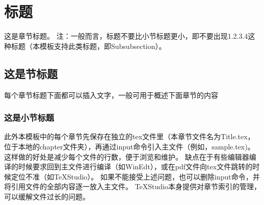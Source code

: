 \chapter{标题}

这是章节标题。
注：一般而言，标题不要比小节标题更小，即不要出现1.2.3.4这种标题（本模板支持此类标题，即Subsubsection）。

\section{这是节标题}

每个章节标题下面都可以插入文字，一般可用于概述下面章节的内容

\subsection{这是小节标题}

此外本模板中的每个章节先保存在独立的tex文件里（本章节文件名为Title.tex，位于本地的chapter文件夹），再通过input命令引入主文件（例如，sample.tex)。
这样做的好处是减少每个文件的行数，便于浏览和维护。
缺点在于有些编辑器编译的时候要求回到主文件进行编译（如WinEdt），或在pdf文件向tex文件跳转的时候定位不准（如TeXStudio）。
如果不能接受上述问题，也可以删除input命令，并将引用文件的全部内容逐一放入主文件。
TeXStudio本身提供对章节索引的管理，可以缓解文件过长的问题。
